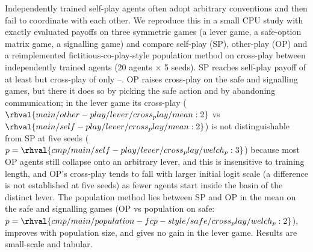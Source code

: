 Independently trained self-play agents often adopt arbitrary conventions and then fail to coordinate with each other. We reproduce this in a small CPU study with exactly evaluated payoffs on three symmetric games (a lever game, a safe-option matrix game, a signalling game) and compare self-play (SP), other-play (OP) and a reimplemented fictitious-co-play-style population method on cross-play between independently trained agents (20 agents $\times$ 5 seeds). SP reaches self-play payoff of at least  but cross-play of only --. OP raises cross-play on the safe and signalling games, but there it does so by picking the safe action and by abandoning communication; in the lever game its cross-play ($\rhval{main/other-play/lever/cross_play/mean:2}$ vs $\rhval{main/self-play/lever/cross_play/mean:2}$) is not distinguishable from SP at five seeds ($p=\rhval{cmp/main/self-play/lever/cross_play/welch_p:3}$) because most OP agents still collapse onto an arbitrary lever, and this is insensitive to training length, and OP's cross-play tends to fall with larger initial logit scale (a difference is not established at five seeds) as fewer agents start inside the basin of the distinct lever. The population method lies between SP and OP in the mean on the safe and signalling games (OP vs population on safe: $p=\rhval{cmp/main/population-fcp-style/safe/cross_play/welch_p:2}$), improves with population size, and gives no gain in the lever game. Results are small-scale and tabular.

